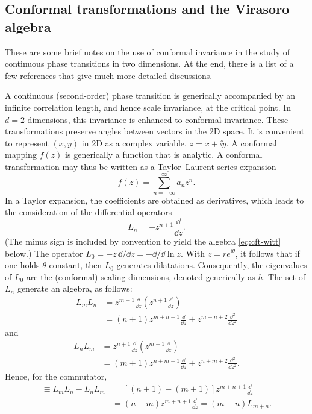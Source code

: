 \subsection{Conformal transformations and the Virasoro algebra}

These are some brief notes on the use of conformal invariance in the study of continuous phase transitions in two
dimensions. At the end, there is a list of a few references that give much more detailed discussions.

A continuous (second-order) phase transition is generically accompanied by an infinite correlation length, and hence
scale invariance, at the critical point. In $d = 2$ dimensions, this invariance is enhanced to conformal invariance.
These transformations preserve angles between vectors in the 2D space. It is convenient to represent $(x,y)$ in 2D as
a complex variable, $z = x+\ii y$. A conformal mapping $f(z)$ is generically a function that is analytic. A conformal
transformation may thus be written as a Taylor--Laurent series expansion
\begin{equation}\label{eq:cft-laurent}
  f(z) = \sum_{n=-\infty}^{\infty} a_nz^n .
\end{equation}
In a Taylor expansion, the coefficients are obtained as derivatives, which leads to the consideration of the
differential operators
\begin{equation}\label{eq:cft-Ln}
  L_n = -z^{n+1}\frac{\dd}{\dd z} .
\end{equation}
(The minus sign is included by convention to yield the algebra \eqref{eq:cft-witt} below.) The operator
$L_0 = -z\,\dd/\dd z = -\dd/\dd\ln z$. With $z = re^{\ii\theta}$, it follows that if one holds $\theta$ constant, then
$L_0$ generates dilatations. Consequently, the eigenvalues of $L_0$ are the (conformal) scaling dimensions, denoted
generically as $h$. The set of $L_n$ generate an algebra, as follows:
\begin{align}
  L_mL_n &= z^{m+1}\frac{\dd}{\dd z}\left(z^{n+1}\frac{\dd}{\dd z}\right) \nonumber\\
         &= (n+1)z^{m+n+1}\frac{\dd}{\dd z} + z^{m+n+2}\frac{\dd^2}{\dd z^2}
\end{align}
and
\begin{align}
  L_nL_m &= z^{n+1}\frac{\dd}{\dd z}\left(z^{m+1}\frac{\dd}{\dd z}\right) \nonumber\\
         &= (m+1)z^{n+m+1}\frac{\dd}{\dd z} + z^{n+m+2}\frac{\dd^2}{\dd z^2} .
\end{align}
Hence, for the commutator,
\begin{align}
  [L_m,L_n] \equiv L_mL_n - L_nL_m &= [(n+1)-(m+1)]z^{m+n+1}\frac{\dd}{\dd z} \nonumber\\
  &= (n-m)z^{m+n+1}\frac{\dd}{\dd z} = (m-n)L_{m+n} . \label{eq:cft-witt}
\end{align}

